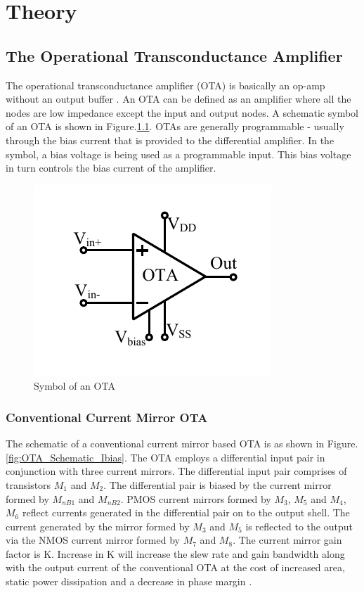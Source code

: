 \chapter{Theory}
\section{The Operational Transconductance Amplifier}
The operational transconductance amplifier (OTA) is basically an op-amp without an output buffer \cite{baker_book}. An OTA can be defined as an amplifier where all the nodes are low impedance except the input and output nodes. A schematic symbol of an OTA is shown in Figure.\ref{fig:OTA_symbol}. OTAs are generally programmable - usually through the bias current that is provided to the differential amplifier. In the symbol, a bias voltage is being used as a programmable input. This bias voltage in turn controls the bias current of the amplifier.

\begin{figure} [H]
\centering
\includegraphics[scale=1]{Figures/System_Level/OTA_Symbol.pdf}
\caption{Symbol of an OTA}
\label{fig:OTA_symbol}
\end{figure}

\subsection{Conventional Current Mirror OTA}
The schematic of a conventional current mirror based OTA is as shown in Figure.\ref{fig:OTA_Schematic_Ibias}. The OTA employs a differential input pair in conjunction with three current mirrors. The differential input pair comprises of transistors $M_1$ and $M_2$. The differential pair is biased by the current mirror formed by $M_{nB1}$ and $M_{nB2}$. PMOS current mirrors formed by $M_3$, $M_5$ and $M_4$, $M_6$ reflect currents generated in the differential pair on to the output shell. The current generated by the mirror formed by $M_3$ and $M_5$ is reflected to the output via the NMOS current mirror formed by $M_7$ and $M_8$. The current mirror gain factor is K. Increase in K will increase the slew rate and gain bandwidth along with the output current of the conventional OTA at the cost of increased area, static power dissipation and a decrease in phase margin \cite{lcmfb_ota}.

